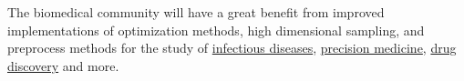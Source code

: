 \documentclass[a4paper, 12pt]{article}
\begin{document}
The biomedical community will have a great benefit from improved implementations of optimization methods, high dimensional sampling, and preprocess methods for the study of \textcolor{blue}{\href{https://www.frontiersin.org/articles/10.3389/fcimb.2020.00052/full}{infectious diseases}}, \textcolor{blue}{\href{https://www.sciencedirect.com/science/article/pii/S155041311730092X}{precision medicine}}, \textcolor{blue}{\href{https://www.sciencedirect.com/science/article/pii/S1359644613002481}{drug discovery}} and more.  



\end{document}
